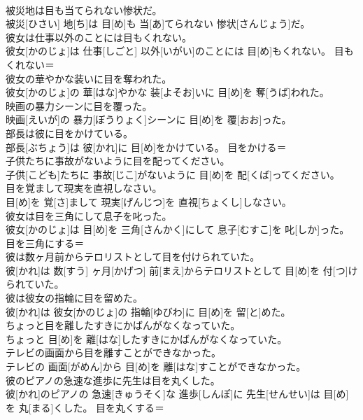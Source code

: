 \documentclass[8pt]{extreport}
\begin{document}
\begin{CJK}{UTF8}{min}
{\\	被災地は目も当てられない惨状だ。	
\\	被災[ひさい] 地[ち]は 目[め]も 当[あ]てられない 惨状[さんじょう]だ。	
\\	彼女は仕事以外のことには目もくれない。	
\\	彼女[かのじょ]は 仕事[しごと] 以外[いがい]のことには 目[め]もくれない。	目もくれない＝ 
\\	彼女の華やかな装いに目を奪われた。	
\\	彼女[かのじょ]の 華[はな]やかな 装[よそお]いに 目[め]を 奪[うば]われた。	
\\	映画の暴力シーンに目を覆った。	
\\	映画[えいが]の 暴力[ぼうりょく]シーンに 目[め]を 覆[おお]った。	
\\	部長は彼に目をかけている。	
\\	部長[ぶちょう]は 彼[かれ]に 目[め]をかけている。	目をかける＝ 
\\	子供たちに事故がないように目を配ってください。	
\\	子供[こども]たちに 事故[じこ]がないように 目[め]を 配[くば]ってください。	
\\	目を覚まして現実を直視しなさい。	
\\	目[め]を 覚[さ]まして 現実[げんじつ]を 直視[ちょくし]しなさい。	
\\	彼女は目を三角にして息子を叱った。	
\\	彼女[かのじょ]は 目[め]を 三角[さんかく]にして 息子[むすこ]を 叱[しか]った。	目を三角にする＝ 
\\	彼は数ヶ月前からテロリストとして目を付けられていた。	
\\	彼[かれ]は 数[すう] ヶ月[かげつ] 前[まえ]からテロリストとして 目[め]を 付[つ]けられていた。	
\\	彼は彼女の指輪に目を留めた。	
\\	彼[かれ]は 彼女[かのじょ]の 指輪[ゆびわ]に 目[め]を 留[と]めた。	
\\	ちょっと目を離したすきにかばんがなくなっていた。	
\\	ちょっと 目[め]を 離[はな]したすきにかばんがなくなっていた。	
\\	テレビの画面から目を離すことができなかった。	
\\	テレビの 画面[がめん]から 目[め]を 離[はな]すことができなかった。	
\\	彼のピアノの急速な進歩に先生は目を丸くした。	
\\	彼[かれ]のピアノの 急速[きゅうそく]な 進歩[しんぽ]に 先生[せんせい]は 目[め]を 丸[まる]くした。	目を丸くする＝ 
}
\end{CJK}
\end{document}
